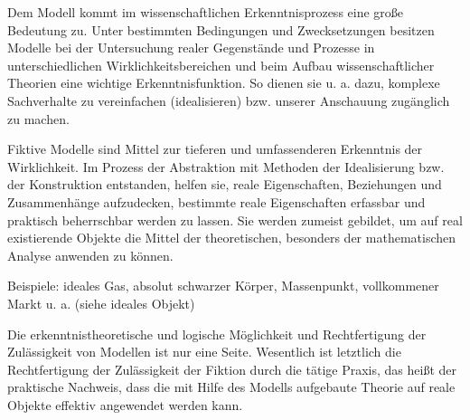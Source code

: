 \documentclass[a4paper, 12pt, pagesize]{scrartcl}
\begin{document}
Dem Modell kommt im wissenschaftlichen Erkenntnisprozess eine große Bedeutung zu. Unter bestimmten Bedingungen und Zwecksetzungen besitzen Modelle bei der Untersuchung realer Gegenstände und Prozesse in unterschiedlichen Wirklichkeitsbereichen und beim Aufbau wissenschaftlicher Theorien eine wichtige Erkenntnisfunktion. So dienen sie u. a. dazu, komplexe Sachverhalte zu vereinfachen (idealisieren) bzw. unserer Anschauung zugänglich zu machen.

Fiktive Modelle sind Mittel zur tieferen und umfassenderen Erkenntnis der Wirklichkeit. Im Prozess der Abstraktion mit Methoden der Idealisierung bzw. der Konstruktion entstanden, helfen sie, reale Eigenschaften, Beziehungen und Zusammenhänge aufzudecken, bestimmte reale Eigenschaften erfassbar und praktisch beherrschbar werden zu lassen. Sie werden zumeist gebildet, um auf real existierende Objekte die Mittel der theoretischen, besonders der mathematischen Analyse anwenden zu können.

Beispiele: ideales Gas, absolut schwarzer Körper, Massenpunkt, vollkommener Markt u. a. (siehe ideales Objekt)

Die erkenntnistheoretische und logische Möglichkeit und Rechtfertigung der Zulässigkeit von Modellen ist nur eine Seite. Wesentlich ist letztlich die Rechtfertigung der Zulässigkeit der Fiktion durch die tätige Praxis, das heißt der praktische Nachweis, dass die mit Hilfe des Modells aufgebaute Theorie auf reale Objekte effektiv angewendet werden kann.
\end{document}
